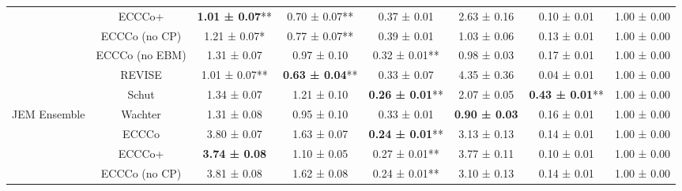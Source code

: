 \begin{table}
{\begin{tabular}[t]{cccccccc}
 & ECCCo+ & \textbf{1.01 ± 0.07}** & 0.70 ± 0.07** & 0.37 ± 0.01\hphantom{*}\hphantom{*} & 2.63 ± 0.16\hphantom{*}\hphantom{*} & 0.10 ± 0.01\hphantom{*}\hphantom{*} & 1.00 ± 0.00\hphantom{*}\hphantom{*}\\

 & ECCCo (no CP) & 1.21 ± 0.07*\hphantom{*} & 0.77 ± 0.07** & 0.39 ± 0.01\hphantom{*}\hphantom{*} & 1.03 ± 0.06\hphantom{*}\hphantom{*} & 0.13 ± 0.01\hphantom{*}\hphantom{*} & 1.00 ± 0.00\hphantom{*}\hphantom{*}\\

 & ECCCo (no EBM) & 1.31 ± 0.07\hphantom{*}\hphantom{*} & 0.97 ± 0.10\hphantom{*}\hphantom{*} & 0.32 ± 0.01** & 0.98 ± 0.03\hphantom{*}\hphantom{*} & 0.17 ± 0.01\hphantom{*}\hphantom{*} & 1.00 ± 0.00\hphantom{*}\hphantom{*}\\

 & REVISE & 1.01 ± 0.07** & \textbf{0.63 ± 0.04}** & 0.33 ± 0.07\hphantom{*}\hphantom{*} & 4.35 ± 0.36\hphantom{*}\hphantom{*} & 0.04 ± 0.01\hphantom{*}\hphantom{*} & 1.00 ± 0.00\hphantom{*}\hphantom{*}\\

 & Schut & 1.34 ± 0.07\hphantom{*}\hphantom{*} & 1.21 ± 0.10\hphantom{*}\hphantom{*} & \textbf{0.26 ± 0.01}** & 2.07 ± 0.05\hphantom{*}\hphantom{*} & \textbf{0.43 ± 0.01}** & 1.00 ± 0.00\hphantom{*}\hphantom{*}\\

\multirow[t]{-7}{*}{\centering\arraybackslash JEM Ensemble} & Wachter & 1.31 ± 0.08\hphantom{*}\hphantom{*} & 0.95 ± 0.10\hphantom{*}\hphantom{*} & 0.33 ± 0.01\hphantom{*}\hphantom{*} & \textbf{0.90 ± 0.03}\hphantom{*}\hphantom{*} & 0.16 ± 0.01\hphantom{*}\hphantom{*} & 1.00 ± 0.00\hphantom{*}\hphantom{*}\\
\cmidrule{1-8}
 & ECCCo & 3.80 ± 0.07\hphantom{*}\hphantom{*} & 1.63 ± 0.07\hphantom{*}\hphantom{*} & \textbf{0.24 ± 0.01}** & 3.13 ± 0.13\hphantom{*}\hphantom{*} & 0.14 ± 0.01\hphantom{*}\hphantom{*} & 1.00 ± 0.00\hphantom{*}\hphantom{*}\\

 & ECCCo+ & \textbf{3.74 ± 0.08}\hphantom{*}\hphantom{*} & 1.10 ± 0.05\hphantom{*}\hphantom{*} & 0.27 ± 0.01** & 3.77 ± 0.11\hphantom{*}\hphantom{*} & 0.10 ± 0.01\hphantom{*}\hphantom{*} & 1.00 ± 0.00\hphantom{*}\hphantom{*}\\

 & ECCCo (no CP) & 3.81 ± 0.08\hphantom{*}\hphantom{*} & 1.62 ± 0.08\hphantom{*}\hphantom{*} & 0.24 ± 0.01** & 3.10 ± 0.13\hphantom{*}\hphantom{*} & 0.14 ± 0.01\hphantom{*}\hphantom{*} & 1.00 ± 0.00\hphantom{*}\hphantom{*}\\


\end{tabular}}
\end{table}
